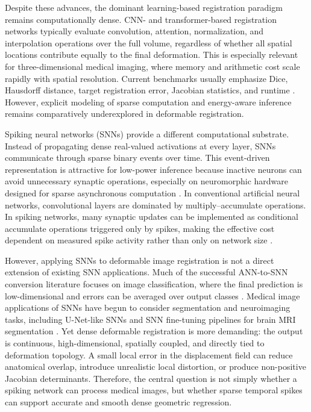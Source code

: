 Despite these advances, the dominant learning-based registration paradigm remains computationally dense. CNN- and transformer-based registration networks typically evaluate convolution, attention, normalization, and interpolation operations over the full volume, regardless of whether all spatial locations contribute equally to the final deformation. This is especially relevant for three-dimensional medical imaging, where memory and arithmetic cost scale rapidly with spatial resolution. Current benchmarks usually emphasize Dice, Hausdorff distance, target registration error, Jacobian statistics, and runtime \citep{hering2023learn2reg}. However, explicit modeling of sparse computation and energy-aware inference remains comparatively underexplored in deformable registration.


Spiking neural networks (SNNs) provide a different computational substrate. Instead of propagating dense real-valued activations at every layer, SNNs communicate through sparse binary events over time. This event-driven representation is attractive for low-power inference because inactive neurons can avoid unnecessary synaptic operations, especially on neuromorphic hardware designed for sparse asynchronous computation \citep{davies2018loihi,davies2021loihi}. In conventional artificial neural networks, convolutional layers are dominated by multiply--accumulate operations. In spiking networks, many synaptic updates can be implemented as conditional accumulate operations triggered only by spikes, making the effective cost dependent on measured spike activity rather than only on network size \citep{horowitz2014energy,rueckauer2017conversion}.

However, applying SNNs to deformable image registration is not a direct extension of existing SNN applications. Much of the successful ANN-to-SNN conversion literature focuses on image classification, where the final prediction is low-dimensional and errors can be averaged over output classes \citep{diehl2015fast,rueckauer2017conversion}. Medical image applications of SNNs have begun to consider segmentation and neuroimaging tasks, including U-Net-like SNNs and SNN fine-tuning pipelines for brain MRI segmentation \citep{patel2021spikingseg,yue2023snnseg}. Yet dense deformable registration is more demanding: the output is continuous, high-dimensional, spatially coupled, and directly tied to deformation topology. A small local error in the displacement field can reduce anatomical overlap, introduce unrealistic local distortion, or produce non-positive Jacobian determinants. Therefore, the central question is not simply whether a spiking network can process medical images, but whether sparse temporal spikes can support accurate and smooth dense geometric regression.

